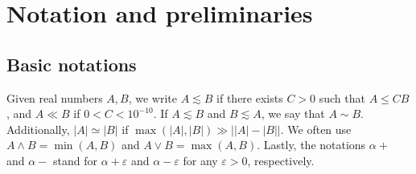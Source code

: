 \documentclass[%
11pt,  reqno]{amsart}
\newcommand{\5}{\textup{V}}
\newcommand{\FL}{\mathcal{F} L}
\newcommand{\les}{\lesssim}
\newcommand{\eps}{\varepsilon}
\theoremstyle{remark}
\newcommand{\R}{\mathbb{R}}
\newcommand{\al}{\alpha}
\numberwithin{equation}{section}
\numberwithin{theorem}{section}
\begin{document}
	
	
	
	
	
	\newpage
	
\section{Notation and preliminaries}

\subsection{Basic notations}
Given real numbers $A,B$, we write $A \les B$ if there exists $C>0$ such that $A \le CB$, and $A \ll B$ if $0<C< 10^{-10}$. If $A\les B$ and $B\les A$, we say that $A\sim B$. Additionally, $|A| \simeq |B|$ if $\max(|A|,|B|) \gg \big| |A| - |B| \big|$. 
We often use $A \land B = \min(A,B)$ and $A \lor B = \max(A,B)$. 
Lastly, 
the notations $\al +$ and $\al-$ stand for $\al+\eps$ and $\al-\eps$ for any $\eps>0$, respectively. 
\end{document}
